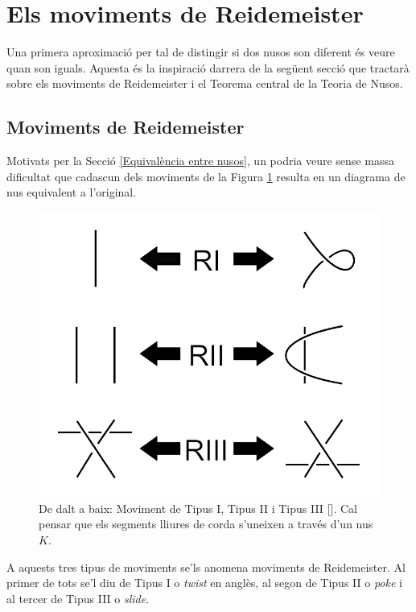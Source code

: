 
\section{Els moviments de Reidemeister}\label{sec:Reidermeister}
Una primera aproximació per tal de distingir si dos nusos son diferent és veure quan son iguals. Aquesta és la inspiració darrera de la següent secció que tractarà sobre els moviments de Reidemeister i el Teorema central de la Teoria de Nusos.

\subsection{Moviments de Reidemeister}\label{subsec:Moviments de Reidemeister}
Motivats per la Secció \ref{Equivalència entre nusos}, un podria veure sense massa dificultat que cadascun dels moviments de la Figura \ref{fig:Moviments de Reidemeister} resulta en un diagrama de nus equivalent a l'original.\\

\begin{figure}[h]
	\centering
	\includegraphics[width=0.9\linewidth]{img/movimentsdereidemeister.png}
	\caption{De dalt a baix: Moviment de Tipus I, Tipus II i Tipus III  [\cite{SobreelsmovdeReide}]. Cal pensar que els segments lliures de corda s'uneixen a través d'un nus $K$.}\label{fig:Moviments de Reidemeister}
\end{figure}

A aquests tres tipus de moviments se'ls anomena moviments de Reidemeister. Al primer de tots se'l diu de Tipus I o \textit{twist} en anglès, al segon de Tipus II o \textit{poke} i al tercer de Tipus III o \textit{slide}.\\

